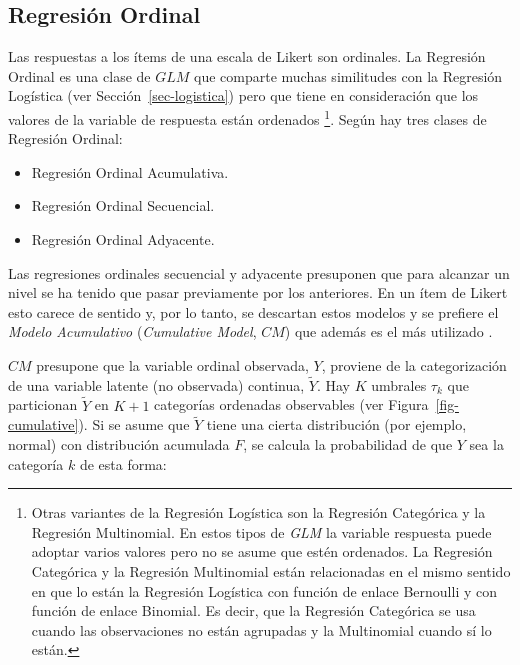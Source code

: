 \documentclass[
  12pt,
  a4paper,
  extrafontsizes,
  onecolumn,
  openright,
  table]{memoir}
\providecommand{\tightlist}{%
  \setlength{\itemsep}{0pt}\setlength{\parskip}{0pt}}\usepackage{longtable,booktabs,array}
\begin{document}
\hypertarget{sec-ordinal}{%
\subsection{Regresión Ordinal}\label{sec-ordinal}}

Las respuestas a los ítems de una escala de Likert son ordinales. La
\gls{Regresión Ordinal} es una clase de \(GLM\) que comparte muchas
similitudes con la Regresión Logística (ver Sección~\ref{sec-logistica})
pero que tiene en consideración que los valores de la variable de
respuesta están ordenados \footnote{Otras variantes de la Regresión
  Logística son la Regresión Categórica y la Regresión Multinomial. En
  estos tipos de \emph{GLM} la variable respuesta puede adoptar varios
  valores pero no se asume que estén ordenados. La Regresión Categórica
  y la Regresión Multinomial están relacionadas en el mismo sentido en
  que lo están la Regresión Logística con función de enlace Bernoulli y
  con función de enlace Binomial. Es decir, que la Regresión Categórica
  se usa cuando las observaciones no están agrupadas y la Multinomial
  cuando sí lo están.}. Según \textcite[pp.~3-11]{burkner2019} hay tres
clases de Regresión Ordinal:

\begin{itemize}
\tightlist
\item
  Regresión Ordinal Acumulativa.
\item
  Regresión Ordinal Secuencial.
\item
  Regresión Ordinal Adyacente.
\end{itemize}

Las regresiones ordinales secuencial y adyacente presuponen que para
alcanzar un nivel se ha tenido que pasar previamente por los anteriores.
En un ítem de Likert esto carece de sentido y, por lo tanto, se
descartan estos modelos y se prefiere el \emph{Modelo Acumulativo}
(\emph{Cumulative Model}, \(CM\)) que además es el más utilizado
\autocite[ver][pp.~23-24]{burkner2019}.

\(CM\) presupone que la variable ordinal observada, \(Y\), proviene de
la categorización de una variable latente (no observada) continua,
\(\tilde{Y}\). Hay \(K\) umbrales \(\tau_k\) que particionan
\(\tilde{Y}\) en \(K + 1\) categorías ordenadas observables (ver
Figura~\ref{fig-cumulative}). Si se asume que \(\tilde{Y}\) tiene una
cierta distribución (por ejemplo, normal) con distribución acumulada
\(F\), se calcula la probabilidad de que \(Y\) sea la categoría \(k\) de
esta forma:
\end{document}
